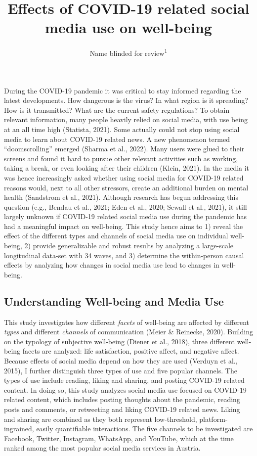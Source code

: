 \documentclass[
  man,mask,floatsintext]{apa7}
\title{Effects of COVID-19 related social media use on well-being}
\author{Name blinded for review\textsuperscript{1}}
\date{}
\affiliation{\vspace{0.5cm}\textsuperscript{1} }
\begin{document}
\maketitle

During the COVID-19 pandemic it was critical to stay informed regarding the latest developments.
How dangerous is the virus?
In what region is it spreading?
How is it transmitted? What are the current safety regulations?
To obtain relevant information, many people heavily relied on social media, with use being at an all time high (Statista, 2021).
Some actually could not stop using social media to learn about COVID-19 related news.
A new phenomenon termed ``doomscrolling'' emerged (Sharma et al., 2022).
Many users were glued to their screens and found it hard to pursue other relevant activities such as working, taking a break, or even looking after their children (Klein, 2021).
In the media it was hence increasingly asked whether using social media for COVID-19 related reasons would, next to all other stressors, create an additional burden on mental health (Sandstrom et al., 2021).
Although research has begun addressing this question
(e.g., Bendau et al., 2021; Eden et al., 2020; Sewall et al., 2021),
it still largely unknown if COVID-19 related social media use during the pandemic has had a meaningful impact on well-being.
This study hence aims to 1) reveal the effect of the different types and channels of social media use on individual well-being, 2) provide generalizable and robust results by analyzing a large-scale longitudinal data-set with 34 waves, and 3) determine the within-person causal effects by analyzing how changes in social media use lead to changes in well-being.

\hypertarget{understanding-well-being-and-media-use}{%
\subsection{Understanding Well-being and Media Use}\label{understanding-well-being-and-media-use}}

This study investigates how different \emph{facets} of well-being are affected by different \emph{types} and different \emph{channels} of communication (Meier \& Reinecke, 2020).
Building on the typology of subjective well-being (Diener et al., 2018), three different well-being facets are analyzed: life satisfaction, positive affect, and negative affect.
Because effects of social media depend on how they are used (Verduyn et al., 2015), I further distinguish three types of use and five popular channels.
The types of use include reading, liking and sharing, and posting COVID-19 related content.
In doing so, this study analyzes social media use focused on COVID-19 related content, which includes posting thoughts about the pandemic, reading posts and comments, or retweeting and liking COVID-19 related news.
Liking and sharing are combined as they both represent low-threshold, platform-ingrained, easily quantifiable interactions.
The five channels to be investigated are Facebook, Twitter, Instagram, WhatsApp, and YouTube, which at the time ranked among the most popular social media services in Austria.
\end{document}
